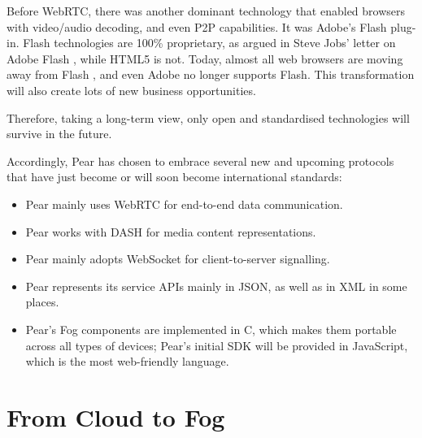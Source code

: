 Before WebRTC, there was another dominant technology that enabled browsers with video/audio decoding, and even P2P capabilities. It was Adobe's Flash plug-in. Flash technologies are 100\% proprietary, as argued in Steve Jobs' letter on Adobe Flash \cite{thoughts-on-flash}, while HTML5 is not. Today, almost all web browsers are moving away from Flash \cite{ff-away-flash}, and even Adobe no longer supports Flash. This transformation will also create lots of new business opportunities. 

Therefore, taking a long-term view, only open and standardised technologies will survive in the future. 

Accordingly, Pear has chosen to embrace several new and upcoming protocols that have just become or will soon become international standards:
\begin{itemize}
	\item Pear mainly uses WebRTC for end-to-end data communication. 
	\item Pear works with DASH for media content representations. 
	\item Pear mainly adopts WebSocket for client-to-server signalling. 
	\item Pear represents its service APIs mainly in JSON, as well as in XML in some places. 
	\item Pear's Fog components are implemented in C, which makes them portable across all types of devices; Pear's initial SDK will be provided in JavaScript, which is the most web-friendly language. 
\end{itemize}

\section{From Cloud to Fog}
